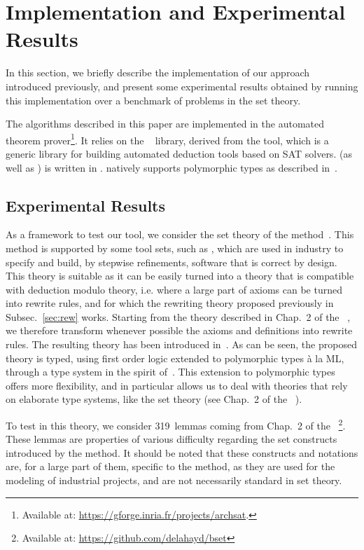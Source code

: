 
\section{Implementation and Experimental Results}
\label{sec:bench}

In this section, we briefly describe the implementation of our approach
introduced previously, and present some experimental results obtained by running
this implementation over a benchmark of problems in the \bmth{} set theory.

The algorithms described in this paper are implemented in the \archsat{}
automated theorem prover\footnote{Available at:
\url{https://gforge.inria.fr/projects/archsat}.}. It relies on the
\msat{}~\cite{GB17} library, derived from the \altergoz{} tool, which is a
generic library for building automated deduction tools based on SAT solvers.
\archsat{} (as well as \msat{}) is written in \ocaml{}. \archsat{} natively
supports polymorphic types as described in~\cite{BP13}.

\subsection{Experimental Results}

As a framework to test our tool, we consider the set theory of the \bmth{}
method~\cite{B-Book}. This method is supported by some tool sets, such as
\atelierb{}, which are used in industry to specify and build, by stepwise
refinements, software that is correct by design. This theory is suitable as it
can be easily turned into a theory that is compatible with deduction modulo
theory, i.e. where a large part of axioms can be turned into rewrite rules, and
for which the rewriting theory proposed previously in Subsec.~\ref{sec:rew}
works. Starting from the theory described in Chap.~2 of the
\bbook{}~\cite{B-Book}, we therefore transform whenever possible the axioms and
definitions into rewrite rules. The resulting theory has been introduced
in~\cite{BA15}. As can be seen, the proposed theory is typed, using first order logic extended
to polymorphic types à la ML, through a type system in the spirit
of~\cite{BP13}. This extension to polymorphic types offers more flexibility, and
in particular allows us to deal with theories that rely on elaborate type
systems, like the \bmth{} set theory (see Chap.~2 of the
\bbook{}~\cite{B-Book}).

To test \archsat{} in this theory, we consider 319~lemmas coming from Chap.~2 of
the \bbook{}~\cite{B-Book}\footnote{Available at: \url{https://github.com/delahayd/bset}}.
These lemmas are properties of various difficulty
regarding the set constructs introduced by the \bmth{} method. It should be
noted that these constructs and notations are, for a large part of them,
specific to the \bmth{} method, as they are used for the modeling of industrial
projects, and are not necessarily standard in set theory.

